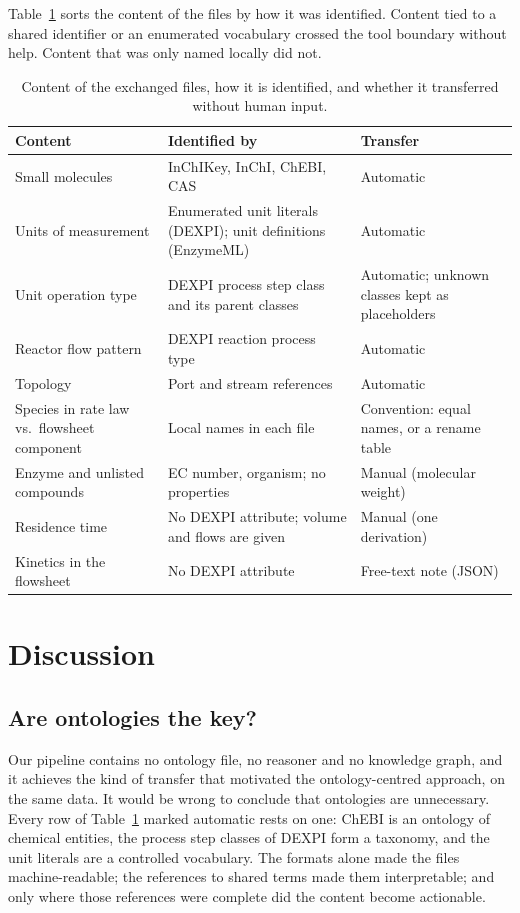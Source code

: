 \documentclass[preprint,12pt]{elsarticle}
\begin{document}
Table~\ref{tab:anchors} sorts the content of the files by how it was
identified. Content tied to a shared identifier or an enumerated
vocabulary crossed the tool boundary without help. Content that was only
named locally did not.

\begin{table}[t]
\caption{Content of the exchanged files, how it is identified, and whether
it transferred without human input.}
\label{tab:anchors}
\small
\begin{tabularx}{\textwidth}{@{}>{\raggedright\arraybackslash}p{33mm}
    >{\raggedright\arraybackslash}X
    >{\raggedright\arraybackslash}p{36mm}@{}}
\toprule
Content & Identified by & Transfer \\
\midrule
Small molecules & InChIKey, InChI, ChEBI, CAS & Automatic \\
Units of measurement & Enumerated unit literals (DEXPI); unit definitions
  (EnzymeML) & Automatic \\
Unit operation type & DEXPI process step class and its parent classes &
  Automatic; unknown classes kept as placeholders \\
Reactor flow pattern & DEXPI reaction process type & Automatic \\
Topology & Port and stream references & Automatic \\
Species in rate law vs.\ flowsheet component & Local names in each file &
  Convention: equal names, or a rename table \\
Enzyme and unlisted compounds & EC number, organism; no properties &
  Manual (molecular weight) \\
Residence time & No DEXPI attribute; volume and flows are given & Manual
  (one derivation) \\
Kinetics in the flowsheet & No DEXPI attribute & Free-text note (JSON) \\
\bottomrule
\end{tabularx}
\end{table}

\section{Discussion}

\subsection{Are ontologies the key?}

Our pipeline contains no ontology file, no reasoner and no knowledge
graph, and it achieves the kind of transfer that motivated the
ontology-centred approach, on the same data. It would be wrong to conclude
that ontologies are unnecessary. Every row of Table~\ref{tab:anchors}
marked automatic rests on one: ChEBI is an ontology of chemical entities,
the process step classes of DEXPI form a taxonomy, and the unit literals
are a controlled vocabulary. The formats alone made the files
machine-readable; the references to shared terms made them interpretable;
and only where those references were complete did the content become
actionable.
\end{document}
